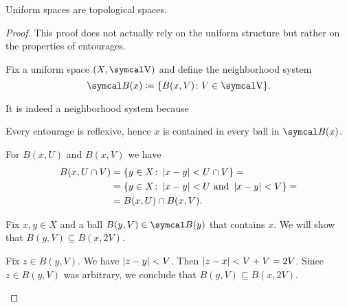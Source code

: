 \begin{proposition}\label{thm:uniform_spaces_are_topological}
  Uniform spaces are topological spaces.
\end{proposition}
\begin{proof}
  This proof does not actually rely on the uniform structure but rather on the properties of entourages.

  Fix a uniform space \( (X, \CV) \) and define the neighborhood system
  \begin{equation*}
    \Cal{B}(x) \coloneqq \{ B(x, V) \colon V \in \CV \}.
  \end{equation*}

  It is indeed a neighborhood system because
  \begin{description}
     Every entourage is reflexive, hence \( x \) is contained in every ball in \( \Cal{B}(x) \).

     For \( B(x, U) \) and \( B(x, V) \) we have
    \begin{align*}
      B(x, U \cap V)
      &=
      \{ y \in X \colon \left\vert x - y \right\vert < U \cap V \}
      = \\ &=
      \{ y \in X \colon \left\vert x - y \right\vert < U \text{ and } \left\vert x - y \right\vert < V \}
      = \\ &=
      B(x, U) \cap B(x, V).
    \end{align*}

     Fix \( x, y \in X \) and a ball \( B(y, V) \in \Cal{B}(y) \) that contains \( x \). We will show that \( B(y, V) \subseteq B(x, 2V) \).

    Fix \( z \in B(y, V) \). We have \( \left\vert z - y \right\vert < V \). Then \( \left\vert z - x \right\vert < V + V = 2V \). Since \( z \in B(y, V) \) was arbitrary, we conclude that \( B(y, V) \subseteq B(x, 2V) \).
  \end{description}
\end{proof}

